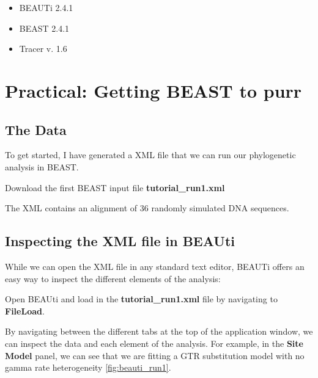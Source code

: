 \documentclass[11pt]{article}
\begin{document}
\begin{itemize}
\item BEAUTi 2.4.1 
\item BEAST 2.4.1 
\item Tracer v. 1.6 
\end{itemize}


\newpage
\section{Practical: Getting BEAST to purr}


\bigskip
\subsection{The Data}

To get started, I have generated a XML file that we can run our phylogenetic analysis in BEAST.

\begin{framed}
Download the first BEAST input file \textbf{tutorial\_run1.xml}
\end{framed}

The XML contains an alignment of 36 randomly simulated DNA sequences. 

\bigskip
\subsection{Inspecting the XML file in BEAUti}

While we can open the XML file in any standard text editor, BEAUTi offers an easy way to inspect the different elements of the analysis: 

\begin{framed}
Open BEAUti and load in the \textbf{tutorial\_run1.xml} file by navigating to \textbf{File\textrightarrow Load}.
\end{framed}

By navigating between the different tabs at the top of the application window, we can inspect the data and each element of the analysis. For example, in the \textbf{Site Model} panel, we can see that we are fitting a GTR substitution model with no gamma rate heterogeneity \ref{fig:beauti_run1}.
\end{document}
